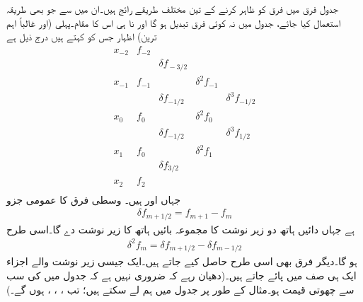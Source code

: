 جدول فرق میں فرق کو ظاہر کرنے  کے تین مختلف  طریقے رائج ہیں۔ان میں سے جو بھی طریقہ استعمال کیا جائے، جدول میں نہ کوئی فرق تبدیل ہو گا اور نا ہی اس کا مقام۔پہلی (اور غالباً اہم ترین) اظہار  جس کو  کہتے ہیں درج ذیل ہے
\begin{equation*}
\begin{array}{lllll}
x_{-2}&f_{-2}&&&\\
&&\delta f_{\!-3/2}&&\\
x_{-1}&f_{-1}&&\delta^2f_{-1}&\\
&&\delta f_{-1/2}&&\delta^3f_{-1/2}\\
x_0&f_0&&\delta^2f_{0}&\\
&&\delta f_{-1/2}&&\delta^3f_{1/2}\\
x_1&f_0&&\delta^2f_{1}&\\
&&\delta f_{3/2}&&\\
x_2&f_2&&&\\
&&&&
\end{array}
\end{equation*}
جہاں  اور  ہیں۔ وسطی فرق کا  عمومی جزو
\begin{align}
\delta f_{m+1/2}=f_{m+1}-f_m
\end{align}
ہے جہاں دائیں ہاتھ دو زیر نوشت کا مجموعہ  بائیں ہاتھ کا زیر نوشت دے گا۔اسی طرح
\begin{align*}
\delta^2 f_{m}=\delta f_{m+1/2}-\delta f_{m-1/2}
\end{align*}
ہو گا۔دیگر فرق بھی اسی طرح حاصل کیے جاتے ہیں۔ایک جیسی زیر نوشت والے اجزاء ایک ہی صف میں پائے جاتے ہیں۔(دھیان رہے کہ ضروری نہیں ہے کہ جدول میں  کی سب سے چھوتی قیمت  ہو۔مثال کے طور پر جدول  میں ہم  لے سکتے ہیں؛ تب ، ، ،  ہوں گے۔)

